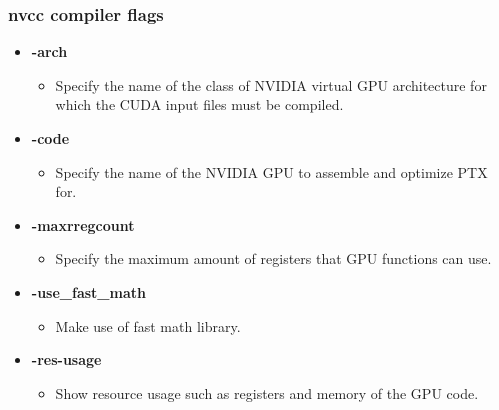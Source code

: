 \documentclass[aspectratio=169,handout]{beamer}
\begin{document}
\begin{frame}[fragile]
\frametitle{nvcc compiler flags}

\begin{itemize}
	\item[] \textbf{-arch}
	\begin{itemize}
		\item[] Specify the name of the class of NVIDIA virtual GPU architecture for which the CUDA input files must be compiled. 
	\end{itemize}
	
	\item[] \textbf{-code}
	\begin{itemize}
		\item[] Specify the name of the NVIDIA GPU to assemble and optimize PTX for. 
	\end{itemize}
	
	\item[] \textbf{-maxrregcount}
	\begin{itemize}
		\item[] Specify the maximum amount of registers that GPU functions can use. 
	\end{itemize}

	\item[] \textbf{-use\_fast\_math}
\begin{itemize}
	\item[] Make use of fast math library.
\end{itemize}


\item[] \textbf{-res-usage}
\begin{itemize}
	\item[] Show resource usage such as registers and memory of the GPU code. 
\end{itemize}

\end{itemize}
\end{frame}
\end{document}
